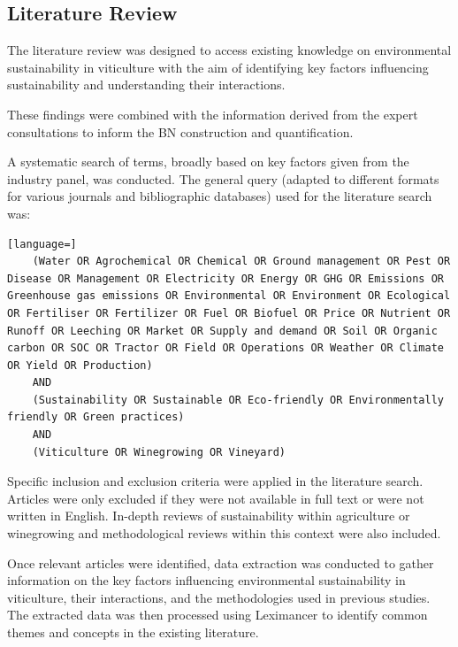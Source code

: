 \subsection{Literature Review}

The literature review was designed to access existing knowledge on environmental sustainability in viticulture with the aim of identifying key factors influencing sustainability and understanding their interactions.

These findings were combined with the information derived from the expert consultations to inform the BN construction and quantification. 

A systematic search of terms, broadly based on key factors given from the industry panel, was conducted. The general query (adapted to different formats for various journals and bibliographic databases) used for the literature search was: 

\begin{lstlisting}[language=]
    (Water OR Agrochemical OR Chemical OR Ground management OR Pest OR Disease OR Management OR Electricity OR Energy OR GHG OR Emissions OR Greenhouse gas emissions OR Environmental OR Environment OR Ecological OR Fertiliser OR Fertilizer OR Fuel OR Biofuel OR Price OR Nutrient OR Runoff OR Leeching OR Market OR Supply and demand OR Soil OR Organic carbon OR SOC OR Tractor OR Field OR Operations OR Weather OR Climate OR Yield OR Production)
    AND
    (Sustainability OR Sustainable OR Eco-friendly OR Environmentally friendly OR Green practices)
    AND
    (Viticulture OR Winegrowing OR Vineyard)
    \end{lstlisting}

Specific inclusion and exclusion criteria were applied in the literature search. Articles were only excluded if they were not available in full text or were not written in English. In-depth reviews of sustainability within agriculture or winegrowing and methodological reviews within this context were also included.

Once relevant articles were identified, data extraction was conducted to gather information on the key factors influencing environmental sustainability in viticulture, their interactions, and the methodologies
used in previous studies. The extracted data was then processed using Leximancer to identify common themes and concepts in the existing literature.


